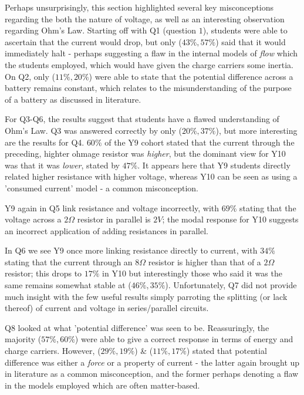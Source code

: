 \documentclass[a4paper,openany,nobib]{tufte-book}
\begin{document}
Perhaps unsurprisingly, this section highlighted several key misconceptions regarding the both the nature of voltage, as well as an interesting observation regarding Ohm's Law. 
Starting off with Q1 (question $1$), students were able to ascertain that the current would drop,
but only ($43\%,57\%$) said that it would immediately halt - perhaps suggesting a flaw in the internal models of \emph{flow} which the students employed, which would have given the charge carriers some inertia. 
On Q2, only ($11\%, 20\%$) were able to state that the potential difference across a battery remains constant, which relates to the misunderstanding of the purpose of a battery as discussed in literature\autocite{shipstone_children}. 

For Q3-Q6, the results suggest that students have a flawed understanding of Ohm's Law. Q3 was answered correctly by only ($20\%,37\%$), but more interesting are the results for Q4. $60\%$ of the Y9 cohort stated that the current through the preceding, highter ohmage resistor was \emph{higher}, but the dominant view for Y10 was that it was \emph{lower}, stated by $47\%$. It appears here that Y9 students directly related higher resistance with higher voltage, whereas Y10 can be seen as using a 'consumed current' model - a common misconception.

Y9 again in Q5 link resistance and voltage incorrectly, with $69\%$ stating that the voltage across a $2\Omega$ resistor in parallel is $2V$; the modal response for Y10 suggests an incorrect application of adding resistances in parallel. 

In Q6 we see Y9 once more linking resistance directly to current, with $34\%$ stating that the current through an $8\Omega$ resistor is higher than that of a $2\Omega$ resistor; this drops to $17\%$ in Y10 but interestingly those who said it was the same remains somewhat stable at ($46\%,35\%$). Unfortunately, Q7 did not provide much insight with the few useful results simply parroting the splitting (or lack thereof) of current and voltage in series/parallel circuits.

Q8 looked at what 'potential difference' was seen to be. Reassuringly, the majority ($57\%,60\%$) were able to give a correct response in terms of energy and charge carriers. However, ($29\%,19\%$) \& ($11\%,17\%$) stated that potential difference was either a \emph{force} or a property of current - the latter again brought up in literature as a common misconception, and the former perhaps denoting a flaw in the models employed which are often matter-based.
\end{document}
